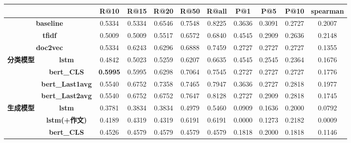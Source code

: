 \documentclass[11pt]{article}
\begin{document}
\begin{CJK}{UTF8}{gkai}
\begin{table}[htbp]\small
  \centering
    \begin{tabular}{c|c|c|c|c|c|c|c|c|c|c}
      \hline
      \multicolumn{2}{c|}{} & \textbf{R@10} & \textbf{R@15} & \textbf{R@20} & \textbf{R@50} & \textbf{R@all} & \textbf{P@1} & \textbf{P@5} & \textbf{P@10} & \textbf{spearman} \\
      \hline
      \multicolumn{2}{c|}{\textbf{baseline}} & 0.5334  & 0.5334  & 0.6546  & 0.7548  & 0.8225  & 0.3636  & 0.3091  & 0.2727  & 0.2007  \\
      \hline
      \multicolumn{2}{c|}{\textbf{tfidf}} & \textcolor[rgb]{ .502,  .502,  .502}{0.5009 } & \textcolor[rgb]{ .502,  .502,  .502}{0.5009 } & \textcolor[rgb]{ .502,  .502,  .502}{0.5517 } & \textcolor[rgb]{ .502,  .502,  .502}{0.6572 } & \textcolor[rgb]{ .502,  .502,  .502}{0.6840 } & \textcolor[rgb]{ .502,  .502,  .502}{0.4545 } & \textcolor[rgb]{ .502,  .502,  .502}{0.2909 } & \textcolor[rgb]{ .502,  .502,  .502}{0.2636 } & \textcolor[rgb]{ .502,  .502,  .502}{0.2148 } \\
      \hline
      \multicolumn{2}{c|}{\textbf{doc2vec}} & 0.5334  & 0.6243  & 0.6296  & 0.6888  & 0.7459  & 0.2727  & 0.2727  & 0.2727  & 0.1355  \\
      \hline
      \multirow{4}[0]{*}{\textbf{分类模型}} & \textbf{lstm} & 0.4842  & 0.5023  & 0.5259  & 0.6207  & 0.6635  & 0.4545  & 0.2545  & 0.2364  & 0.1676  \\
      & \textbf{bert\_CLS} & \textcolor[rgb]{ 1,  0,  0}{\textbf{0.5995 }} & 0.5995  & 0.6298  & 0.7064  & 0.7545  & 0.2727  & 0.2727  & 0.2727  & 0.1776  \\
      & \textbf{bert\_Last1avg} & 0.5540  & 0.6752  & 0.7358  & 0.7465  & 0.7947  & 0.3636  & 0.2727  & 0.2818  & 0.1977  \\
      & \textbf{bert\_Last2avg} & 0.5540  & 0.6752  & 0.6752  & 0.7647  & 0.8128  & 0.2727  & 0.2909  & 0.2818  & 0.1745  \\
      \hline
      \multirow{6}[0]{*}{\textbf{生成模型}} & \textbf{lstm} & 0.3781  & 0.3834  & 0.3834  & 0.4979  & 0.5460  & 0.0909  & 0.1636  & 0.2000  & 0.0792  \\
      & \textbf{lstm(+作文)} & 0.4189  & 0.4319  & 0.4319  & 0.6191  & 0.6191  & 0.0000  & 0.1273  & 0.2182  & 0.0009  \\
      & \textbf{bert\_CLS} & 0.4526  & 0.4579  & 0.4579  & 0.4579  & 0.4579  & 0.1818  & 0.2000  & 0.1818  & 0.1146  \\

\end{tabular}
\end{table}
\end{CJK}
\end{document}

